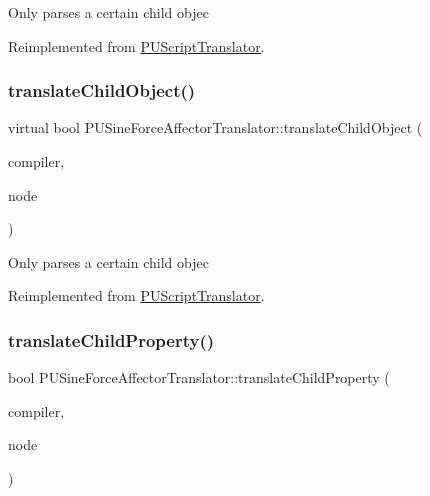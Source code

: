 Only parses a certain child objec 

Reimplemented from \hyperlink{classPUScriptTranslator_ab587d01348ae3e678cb700c719b2b113}{P\+U\+Script\+Translator}.

\mbox{\label{classPUSineForceAffectorTranslator_abab95042ad737cf70fa69f834b848126}} 
\subsubsection{\texorpdfstring{translate\+Child\+Object()}{translateChildObject()}\hspace{0.1cm}{\footnotesize\ttfamily [2/2]}}
{\footnotesize\ttfamily virtual bool P\+U\+Sine\+Force\+Affector\+Translator\+::translate\+Child\+Object (\begin{DoxyParamCaption}\item[{\hyperlink{classPUScriptCompiler}{P\+U\+Script\+Compiler} $\ast$}]{compiler,  }\item[{\hyperlink{classPUAbstractNode}{P\+U\+Abstract\+Node} $\ast$}]{node }\end{DoxyParamCaption})\hspace{0.3cm}{\ttfamily [virtual]}}

Only parses a certain child objec 

Reimplemented from \hyperlink{classPUScriptTranslator_ab587d01348ae3e678cb700c719b2b113}{P\+U\+Script\+Translator}.

\mbox{\label{classPUSineForceAffectorTranslator_a6a4e8154bd3164724c598e1e2243e96c}} 
\subsubsection{\texorpdfstring{translate\+Child\+Property()}{translateChildProperty()}\hspace{0.1cm}{\footnotesize\ttfamily [1/2]}}
{\footnotesize\ttfamily bool P\+U\+Sine\+Force\+Affector\+Translator\+::translate\+Child\+Property (\begin{DoxyParamCaption}\item[{\hyperlink{classPUScriptCompiler}{P\+U\+Script\+Compiler} $\ast$}]{compiler,  }\item[{\hyperlink{classPUAbstractNode}{P\+U\+Abstract\+Node} $\ast$}]{node }\end{DoxyParamCaption})\hspace{0.3cm}{\ttfamily [virtual]}}

